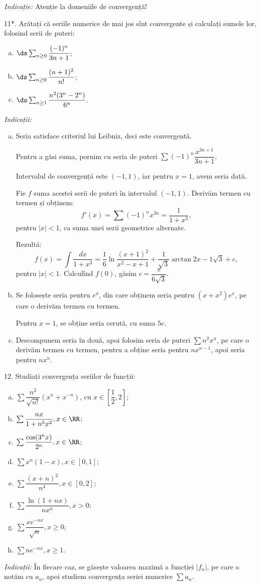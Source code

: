 \emph{Indicație:} Atenție la domeniile de convergență!

\vspace{1cm}

11*. Arătați că seriile numerice de mai jos sînt convergente și calculați
sumele lor, folosind serii de puteri:
\begin{enumerate}[(a)]
\item $ \ds\sum_{n \geq 0} \dfrac{(-1)^n}{3n + 1} $;
\item $ \ds\sum_{n \geq 0} \dfrac{(n+1)^2}{n!} $;
\item $ \ds\sum_{n \geq 1} \dfrac{n^2(3^n - 2^n)}{6^n} $.
\end{enumerate}

\emph{Indicații:}
\begin{enumerate}[(a)]
\item Seria satisface criteriul lui Leibniz, deci este convergentă.

  Pentru a găsi suma, pornim cu seria de puteri $ \sum (-1)^n \dfrac{x^{3n+1}}{3n+1} $.

  Intervalul de convergență este $ (-1, 1) $, iar pentru $ x = 1 $, avem
  seria dată.

  Fie $ f $ suma acestei serii de puteri în intervalul $ (-1, 1) $. Derivăm
  termen cu termen și obținem:
  \[
    f'(x) = \sum (-1)^n x^{3n} = \frac{1}{1 + x^3},
  \]
  pentru $ |x| < 1 $, ca suma unei serii geometrice alternate.

  Rezultă:
  \[
    f(x) = \int \frac{dx}{1 + x^3} = \frac{1}{6} \ln \frac{(x + 1)^2}{x^2 - x + 1} %
    + \frac{1}{\sqrt{3}} \arctan{2x - 1}{\sqrt{3}} + c,
  \]
  pentru $ |x| < 1 $. Calculînd $ f(0) $, găsim $ c = \dfrac{\pi}{6 \sqrt{3}} $.
\item Se folosește seria pentru $ e^x $, din care obținem seria pentru
  $ (x + x^2)e^x $, pe care o derivăm termen cu termen.

  Pentru $ x = 1 $, se obține seria cerută, cu suma $ 5e $.
\item Descompunem seria în două, apoi folosim seria de puteri $ \sum n^2 x^n $,
  pe care o derivăm termen cu termen, pentru a obține seria pentru $ nx^{n-1} $,
  apoi seria pentru $ nx^n $.
\end{enumerate}

12. Studiați convergența seriilor de funcții:
\begin{enumerate}[(a)]
\item $ \sum \dfrac{n^2}{\sqrt{n!}} (x^n + x^{-n}) $, cu $ x \in \left[ \dfrac{1}{2}, 2 \right] $;
\item $ \sum \dfrac{nx}{1 + n^5 x^2}, x \in \RR $;
\item $ \sum \dfrac{\cos(3^n x)}{2^n}, x \in \RR $;
\item $ \sum x^n(1 - x), x \in [0, 1] $;
\item $ \sum \dfrac{(x + n)^2}{n^4}, x \in [0, 2] $;
\item $ \sum \dfrac{\ln(1 + nx)}{nx^n}, x > 0 $;
\item $ \sum \dfrac{xe^{-nx}}{\sqrt{n}}, x \geq 0 $;
\item $ \sum ne^{-nx}, x \geq 1 $.
\end{enumerate}

\emph{Indicații:} În fiecare caz, se găsește valoarea maximă a funcției $ | f_n | $,
pe care o notăm cu $ a_n $, apoi studiem convergența seriei numerice $ \sum a_n $.
